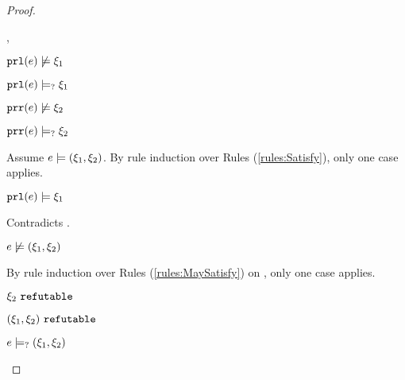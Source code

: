 \begin{proof}
\begin{byCases}
\begin{byCases}
\begin{byCases}
        \item[\cmaysatisfy{\hprl{e}}{\xi_1},\cmaysatisfy{\hprr{e}}{\xi_2}]
            \begin{pfsteps*}
            \item $\mathtt{prl}(e) \not\models \xi_1$  
            \item $\mathtt{prl}(e) \models_{?} \xi_1$  
            \item $\mathtt{prr}(e) \not\models \xi_2$  
            \item $\mathtt{prr}(e) \models_{?} \xi_2$  
            \end{pfsteps*}
            Assume $e \models (\xi_1 , \xi_2)$. By rule induction over Rules (\ref{rules:Satisfy}), only one case applies.
            \begin{byCases}
            \item[\text{(\ref{rule:CSNotValPair})}]
                \begin{pfsteps*}
                \item $\mathtt{prl}(e) \models \xi_1$ 
                \end{pfsteps*}
                Contradicts .
            \end{byCases}
            \begin{pfsteps*}
            \item $e \not\models (\xi_1 , \xi_2)$  
            \end{pfsteps*}
            By rule induction over Rules (\ref{rules:MaySatisfy}) on , only one case applies. 
            \begin{byCases}
            \item[\text{(\ref{rule:CMSNotVal})}]
                \begin{pfsteps*}
                \item $\xi_2 ~\mathtt{refutable}$  
                \item $(\xi_1 , \xi_2) ~\mathtt{refutable}$  
                \item $e \models_{?} (\xi_1 , \xi_2)$  

\end{pfsteps*}
\end{byCases}
\end{byCases}
\end{byCases}
\end{byCases}
\end{proof}
